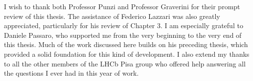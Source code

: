 I wish to thank both Professor Punzi and Professor Graverini for their prompt review of this thesis. The assistance of Federico Lazzari was also greatly appreciated, particularly for his review of Chapter 3. I am especially grateful to Daniele Passaro, who supported me from the very beginning to the very end of this thesis. Much of the work discussed here builds on his preceding thesis, which provided a solid foundation for this kind of development. I also extend my thanks to all the other members of the LHCb Pisa group who offered help answering all the questions I ever had in this year of work.